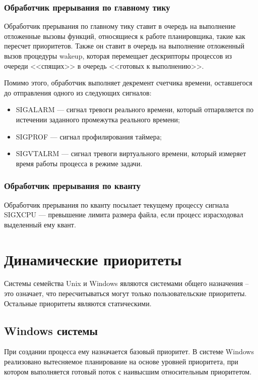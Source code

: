 \subsection{Обработчик прерывания по главному тику}
Обработчик прерывания по главному тику ставит в очередь на выполнение отложенные вызовы функций, относящиеся к работе планировщика, такие как пересчет приоритетов. Также он ставит в очередь на выполнение отложенный вызов процедуры wakeup, которая перемещает дескрипторы процессов из очереди <<спящих>> в очередь <<готовых к выполнению>>.

Помимо этого, обработчик выполняет декремент счетчика времени, оставшегося до отправления одного из следующих сигналов:
\begin{itemize}
	\item SIGALARM --- сигнал тревоги реального времени, который отпарвляется по истечении заданного промежутка реального времени;
	\item SIGPROF --- сигнал профилирования таймера;
	\item SIGVTALRM --- сигнал тревоги виртуального времени, который измеряет время работы процесса в режиме задачи.
\end{itemize}

\subsection{Обработчик прерывания по кванту}

Обработчик прерывания по кванту посылает текущему процессу сигнала  SIGXCPU --- превышение лимита размера файла, если процесс израсходовал выделенный ему квант. \newline\newline

\chapter{Динамические приоритеты}
Системы семейства Unix и Windows являются системами общего назначения -- это означает, что пересчитываться могут только пользовательские приоритеты. Остальные приоритеты являются статическими.
\section{Windows системы}
При создании процесса ему назначается базовый приоритет. В системе Windows реализовано вытесняемое планирование на основе уровней приоритета, при котором выполняется готовый поток с наивысшим относительным приоритетом.

